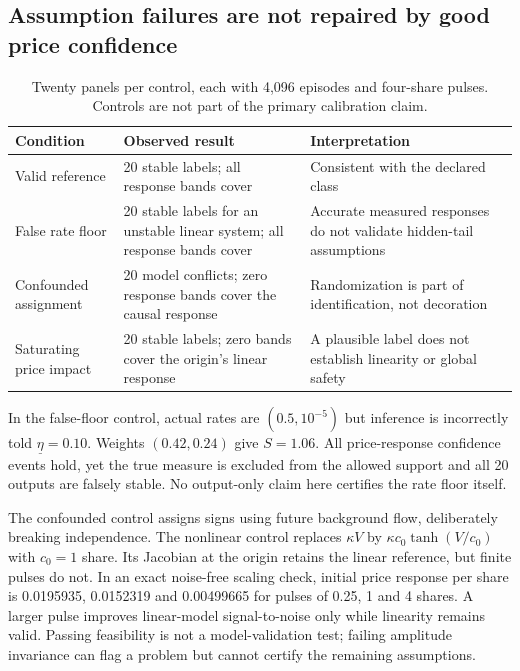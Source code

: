 \documentclass[11pt,a4paper]{article}
\theoremstyle{definition}
\theoremstyle{remark}
\begin{document}
\subsection{Assumption failures are not repaired by good price confidence}
\begin{table}[htbp]
\centering\small
\caption{Twenty panels per control, each with 4,096 episodes and four-share pulses. Controls are not part of the primary calibration claim.}
\label{tab:observable_failures}
\begin{tabularx}{\textwidth}{p{}YY}\toprule
Condition & Observed result & Interpretation\\\midrule
Valid reference & 20 stable labels; all response bands cover & Consistent with the declared class\\
False rate floor & 20 stable labels for an unstable linear system; all response bands cover & Accurate measured responses do not validate hidden-tail assumptions\\
Confounded assignment & 20 model conflicts; zero response bands cover the causal response & Randomization is part of identification, not decoration\\
Saturating price impact & 20 stable labels; zero bands cover the origin's linear response & A plausible label does not establish linearity or global safety\\\bottomrule
\end{tabularx}
\end{table}

In the false-floor control, actual rates are $(0.5,10^{-5})$ but inference is incorrectly told $\underline\eta=0.10$. Weights $(0.42,0.24)$ give $S=1.06$. All price-response confidence events hold, yet the true measure is excluded from the allowed support and all 20 outputs are falsely stable. No output-only claim here certifies the rate floor itself.

The confounded control assigns signs using future background flow, deliberately breaking independence. The nonlinear control replaces $\kappa V$ by $\kappa c_0\tanh(V/c_0)$ with $c_0=1$ share. Its Jacobian at the origin retains the linear reference, but finite pulses do not. In an exact noise-free scaling check, initial price response per share is 0.0195935, 0.0152319 and 0.00499665 for pulses of 0.25, 1 and 4 shares. A larger pulse improves linear-model signal-to-noise only while linearity remains valid. Passing feasibility is not a model-validation test; failing amplitude invariance can flag a problem but cannot certify the remaining assumptions.
\end{document}
